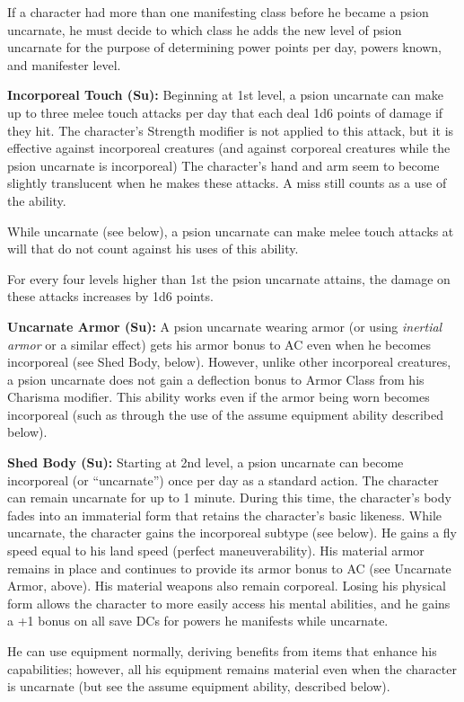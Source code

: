 \documentclass{article}
\begin{document}
If a character had more than one manifesting class before he became a psion uncarnate, 
he must decide to which class he adds the new level of psion uncarnate for the 
purpose of determining power points per day, powers known, and manifester level.

\textbf{Incorporeal Touch (Su):} Beginning at 1st level, a psion uncarnate can 
make up to three melee touch attacks per day that each deal 1d6 points of damage 
if they hit. The character's Strength modifier is not applied to this attack, but 
it is effective against incorporeal creatures (and against corporeal creatures 
while the psion uncarnate is incorporeal) The character's hand and arm seem to 
become slightly translucent when he makes these attacks. A miss still counts as 
a use of the ability.

While uncarnate (see below), a psion uncarnate can make melee touch attacks at 
will that do not count against his uses of this ability. 

For every four levels higher than 1st the psion uncarnate attains, the damage on 
these attacks increases by 1d6 points.

\textbf{Uncarnate Armor (Su):} A psion uncarnate wearing armor (or using \textit{inertial 
armor }or a similar effect) gets his armor bonus to AC even when he becomes incorporeal 
(see Shed Body, below). However, unlike other incorporeal creatures, a psion uncarnate 
does not gain a deflection bonus to Armor Class from his Charisma modifier. This 
ability works even if the armor being worn becomes incorporeal (such as through 
the use of the assume equipment ability described below).

\textbf{Shed Body (Su):} Starting at 2nd level, a psion uncarnate can become incorporeal 
(or ``uncarnate'') once per day as a standard action. The character can remain 
uncarnate for up to 1 minute. During this time, the character's body fades into 
an immaterial form that retains the character's basic likeness. While uncarnate, 
the character gains the incorporeal subtype (see below). He gains a fly speed equal 
to his land speed (perfect maneuverability). His material armor remains in place 
and continues to provide its armor bonus to AC (see Uncarnate Armor, above). His 
material weapons also remain corporeal. Losing his physical form allows the character 
to more easily access his mental abilities, and he gains a +1 bonus on all save 
DCs for powers he manifests while uncarnate.

He can use equipment normally, deriving benefits from items that enhance his capabilities; 
however, all his equipment remains material even when the character is uncarnate 
(but see the assume equipment ability, described below). 
\end{document}

